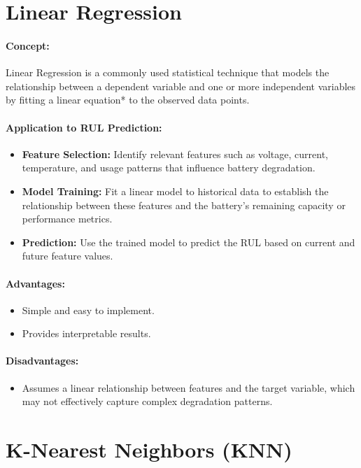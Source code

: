\section{Linear Regression}
\paragraph{Concept:}
Linear Regression is a commonly used statistical technique that models the relationship between a dependent variable and one or more independent variables by fitting a linear equation* to the observed data points.
\paragraph{Application to RUL Prediction:}
\begin{itemize}
    \item \textbf{Feature Selection:} Identify relevant features such as voltage, current, temperature, and usage patterns that influence battery degradation.
    \item \textbf{Model Training:} Fit a linear model to historical data to establish the relationship between these features and the battery's remaining capacity or performance metrics.
    \item \textbf{Prediction:} Use the trained model to predict the RUL based on current and future feature values.
\end{itemize}
\paragraph{Advantages:}
\begin{itemize}
    \item Simple and easy to implement.
    \item Provides interpretable results.
\end{itemize}
\paragraph{Disadvantages:}
\begin{itemize}
    \item Assumes a linear relationship between features and the target variable, which may not effectively capture complex degradation patterns.
\end{itemize}

\section{K-Nearest Neighbors (KNN)}
